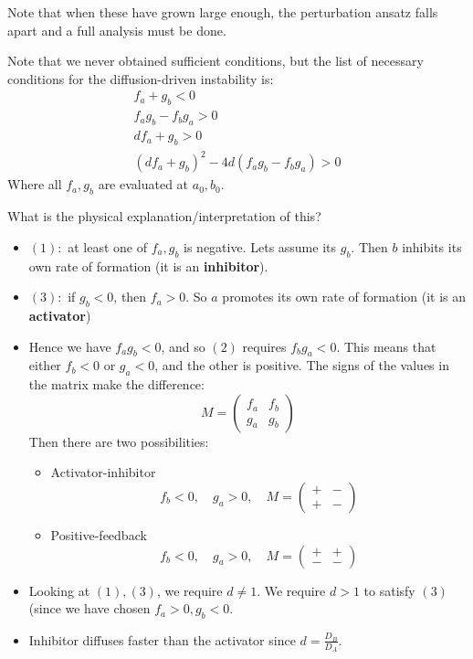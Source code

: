 \documentclass{X:/Documents/Coding/Latex/myassignment}
\begin{document}
Note that when these have grown large enough, the perturbation ansatz falls apart and a full analysis must be done.


Note that we never obtained sufficient conditions, but the list of necessary conditions for the diffusion-driven instability is:
\begin{align}
	f_a + g_b < 0\\
	f_ag_b - f_bg_a > 0\\
	df_a + g_b > 0\\
	(df_a+g_b)^2 - 4d(f_ag_b - f_bg_a) > 0
\end{align}
Where all $f_a,g_b$ are evaluated at $a_0,b_0$.


What is the physical explanation/interpretation of this?
\begin{itemize}
	\item $(1):$ at least one of $f_a,g_b$ is negative. Lets assume its $g_b$. Then $b$ inhibits its own rate of formation (it is an \textbf{inhibitor}).
	\item $(3):$ if $g_b < 0$, then $f_a > 0$. So $a$ promotes its own rate of formation (it is an \textbf{activator})
	\item Hence we have $f_ag_b < 0$, and so $(2)$ requires $f_bg_a <0$. This means that either $f_b <0$ or $g_a < 0$, and the other is positive. The signs of the values in the matrix make the difference:
	\[M = \begin{pmatrix}
		f_a & f_b\\
		g_a & g_b
	\end{pmatrix}\]
	Then there are two possibilities:
	\begin{itemize}
		\item Activator-inhibitor
		\[f_b < 0, \quad g_a > 0, \quad M =\begin{pmatrix}
		+ &-\\
		+& -
	\end{pmatrix}\]
	\item Positive-feedback
		\[f_b < 0, \quad g_a > 0, \quad M =\begin{pmatrix}
		+ &+\\
		-& -
	\end{pmatrix}\]
	\end{itemize}

	\item Looking at $(1),(3)$, we require $d\neq 1$. We require $d > 1$ to satisfy $(3)$ (since we have chosen $f_a > 0, g_b < 0$.
	\item Inhibitor diffuses faster than the activator since $d = \frac{D_B}{D_A}$.
\end{itemize}
\end{document}
